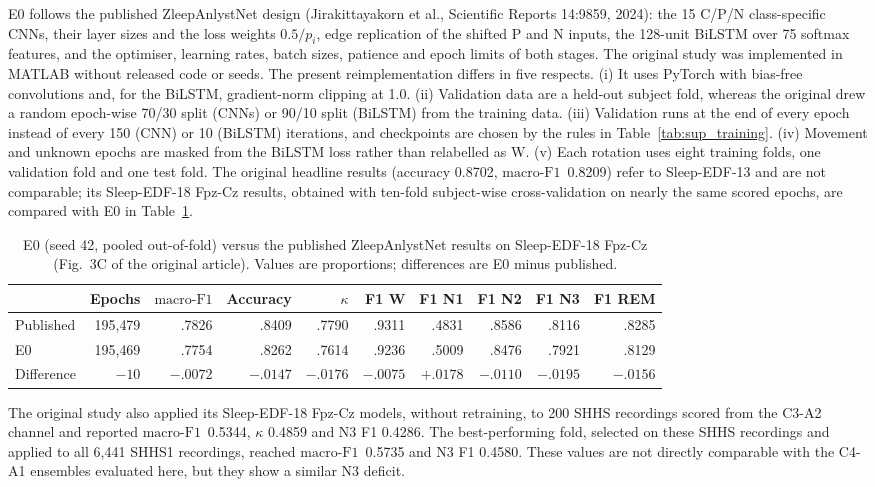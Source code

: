 \documentclass[10pt,a4paper]{article}
\newcommand{\mf}{\ensuremath{\mathrm{macro\text{-}F1}}}
\begin{document}
E0 follows the published ZleepAnlystNet design (Jirakittayakorn et al., Scientific Reports 14:9859, 2024):
the 15 C/P/N class-specific CNNs, their layer sizes and the loss weights $0.5/p_i$, edge replication of
the shifted P and N inputs, the 128-unit BiLSTM over 75 softmax features, and the optimiser, learning
rates, batch sizes, patience and epoch limits of both stages. The original study was implemented in
MATLAB without released code or seeds. The present reimplementation differs in five respects. (i) It
uses PyTorch with bias-free convolutions and, for the BiLSTM, gradient-norm clipping at 1.0. (ii)
Validation data are a held-out subject fold, whereas the original drew a random epoch-wise 70/30 split
(CNNs) or 90/10 split (BiLSTM) from the training data. (iii) Validation runs at the end of every epoch
instead of every 150 (CNN) or 10 (BiLSTM) iterations, and checkpoints are chosen by the rules in
Table~\ref{tab:sup_training}. (iv) Movement and unknown epochs are masked from the BiLSTM loss rather
than relabelled as W. (v) Each rotation uses eight training folds, one validation fold and one test
fold. The original headline results (accuracy 0.8702, \mf\ 0.8209) refer to Sleep-EDF-13 and are not
comparable; its Sleep-EDF-18 Fpz-Cz results, obtained with ten-fold subject-wise cross-validation on
nearly the same scored epochs, are compared with E0 in Table~\ref{tab:sup_e0_original}.

\begin{table}[H]
\centering\small
\caption{E0 (seed 42, pooled out-of-fold) versus the published ZleepAnlystNet results on Sleep-EDF-18
Fpz-Cz (Fig.~3C of the original article). Values are proportions; differences are E0 minus published.}
\label{tab:sup_e0_original}
\begin{tabular}{lrrrrrrrrr}
\toprule
 & Epochs & \mf & Accuracy & $\kappa$ & F1 W & F1 N1 & F1 N2 & F1 N3 & F1 REM \\
\midrule
Published & 195{,}479 & .7826 & .8409 & .7790 & .9311 & .4831 & .8586 & .8116 & .8285 \\
E0 & 195{,}469 & .7754 & .8262 & .7614 & .9236 & .5009 & .8476 & .7921 & .8129 \\
Difference & $-10$ & $-.0072$ & $-.0147$ & $-.0176$ & $-.0075$ & $+.0178$ & $-.0110$ & $-.0195$ & $-.0156$ \\
\bottomrule
\end{tabular}
\end{table}

The original study also applied its Sleep-EDF-18 Fpz-Cz models, without retraining, to 200 SHHS
recordings scored from the C3-A2 channel and reported \mf\ 0.5344, $\kappa$ 0.4859 and N3 F1 0.4286. The
best-performing fold, selected on these SHHS recordings and applied to all 6{,}441 SHHS1 recordings,
reached \mf\ 0.5735 and N3 F1 0.4580. These values are not directly comparable
with the C4-A1 ensembles evaluated here, but they show a similar N3 deficit.
\end{document}
